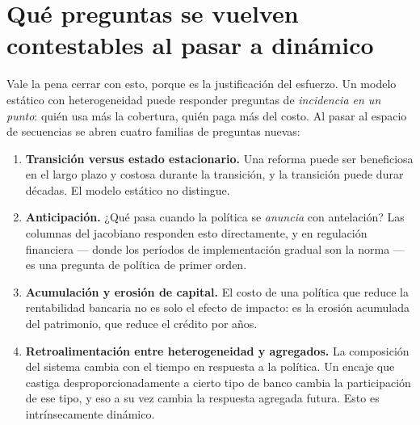 \section{Qué preguntas se vuelven contestables al pasar a dinámico}

Vale la pena cerrar con esto, porque es la justificación del esfuerzo. Un modelo
estático con heterogeneidad puede responder preguntas de \emph{incidencia en un
punto}: quién usa más la cobertura, quién paga más del costo. Al pasar al espacio
de secuencias se abren cuatro familias de preguntas nuevas:

\begin{enumerate}[leftmargin=1.4em]
\item \textbf{Transición versus estado estacionario.} Una reforma puede ser
beneficiosa en el largo plazo y costosa durante la transición, y la transición
puede durar décadas. El modelo estático no distingue.
\item \textbf{Anticipación.} ¿Qué pasa cuando la política se \emph{anuncia} con
antelación? Las columnas del jacobiano responden esto directamente, y en
regulación financiera --- donde los períodos de implementación gradual son la
norma --- es una pregunta de política de primer orden.
\item \textbf{Acumulación y erosión de capital.} El costo de una política que
reduce la rentabilidad bancaria no es solo el efecto de impacto: es la erosión
acumulada del patrimonio, que reduce el crédito por años.
\item \textbf{Retroalimentación entre heterogeneidad y agregados.} La
composición del sistema cambia con el tiempo en respuesta a la política. Un
encaje que castiga desproporcionadamente a cierto tipo de banco cambia la
participación de ese tipo, y eso a su vez cambia la respuesta agregada futura.
Esto es intrínsecamente dinámico.
\end{enumerate}
